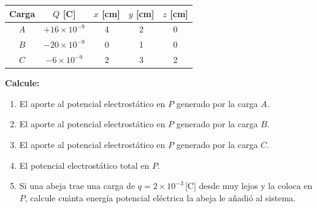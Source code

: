 \documentclass[12pt,letterpaper]{article}
\begin{document}
\hfill
\begin{minipage}[c]{0.46\textwidth}
    \centering
    \renewcommand{\arraystretch}{1.4}
    \begin{tabular}{ccccc}
        \toprule
        \textbf{Carga} & $Q$ [C] & $x$ [cm] & $y$ [cm] & $z$ [cm] \\
        \midrule
        $A$ & $+16\times10^{-9}$ & 4 & 2 & 0 \\
        $B$ & $-20\times10^{-9}$ & 0 & 1 & 0 \\
        $C$ & $-6\times10^{-9}$  & 2 & 3 & 2 \\
        \bottomrule
    \end{tabular}
\end{minipage}

\vspace{0.7cm}

\noindent\textbf{Calcule:}
\begin{enumerate}
    \item El aporte al potencial electrost\'atico en $P$ generado por la carga $A$.
    \item El aporte al potencial electrost\'atico en $P$ generado por la carga $B$.
    \item El aporte al potencial electrost\'atico en $P$ generado por la carga $C$.
    \item El potencial electrost\'atico total en $P$.
    \item Si una abeja trae una carga de $q = 2\times10^{-3}$\,[C] desde muy lejos
          y la coloca en $P$, calcule cu\'anta energ\'ia potencial el\'ectrica la abeja
          le a\~nadi\'o al sistema.
\end{enumerate}
\end{document}
